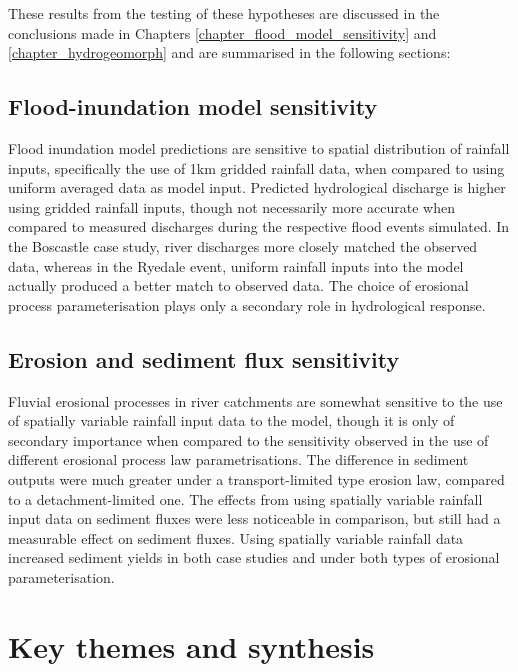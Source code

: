 These results from the testing of these hypotheses are discussed in the conclusions made in Chapters \ref{chapter_flood_model_sensitivity} and \ref{chapter_hydrogeomorph} and are summarised in the following sections:

\subsection{Flood-inundation model sensitivity}
Flood inundation model predictions are sensitive to spatial distribution of rainfall inputs, specifically the use of 1km gridded rainfall data, when compared to using uniform averaged data as model input. Predicted hydrological discharge is higher using gridded rainfall inputs, though not necessarily more accurate when compared to measured discharges during the respective flood events simulated. In the Boscastle case study, river discharges more closely matched the observed data, whereas in the Ryedale event, uniform rainfall inputs into the model actually produced a better match to observed data. The choice of erosional process parameterisation plays only a secondary role in hydrological response. 

\subsection{Erosion and sediment flux sensitivity}
Fluvial erosional processes in river catchments are somewhat sensitive to the use of spatially variable rainfall input data to the model, though it is only of secondary importance when compared to the sensitivity observed in the use of different erosional process law parametrisations. The difference in sediment outputs were much greater under a transport-limited type erosion law, compared to a detachment-limited one. The effects from using spatially variable rainfall input data on sediment fluxes were less noticeable in comparison, but still had a measurable effect on sediment fluxes. Using spatially variable rainfall data increased sediment yields in both case studies and under both types of erosional parameterisation.

\section{Key themes and synthesis}

